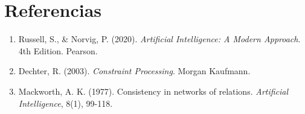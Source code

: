 \documentclass[12pt,a4paper]{article}
\begin{document}
\section{Referencias}

\begin{enumerate}
    \item Russell, S., \& Norvig, P. (2020). \textit{Artificial Intelligence: A Modern Approach}. 4th Edition. Pearson.
    \item Dechter, R. (2003). \textit{Constraint Processing}. Morgan Kaufmann.
    \item Mackworth, A. K. (1977). Consistency in networks of relations. \textit{Artificial Intelligence}, 8(1), 99-118.
\end{enumerate}
\end{document}
